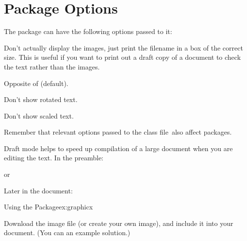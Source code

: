 \section{Package Options}

The  package can have the following options passed to 
it:
\begin{fwlist}{}
 Don't actually display the
images, just print the filename in a box of the correct size.  This
is useful if you want to print out a draft copy of a document to
check the text rather than the images.

 Opposite of 
 (default).

 Don't show rotated
text.

 Don't show scaled text.

\end{fwlist}

Remember that relevant options passed to the class file\indexCLS\ also 
affect packages.


Draft mode helps to speed up compilation of a large document when
you are editing the text. In the preamble:
\begin{codeS}
\end{codeS}
or
\begin{code}
\begin{alltt}

\end{alltt}
\end{code}
Later in the document:
\begin{codeS}
\end{codeS}
\begin{resultS}
\end{resultS}

\begin{exercise}{Using the  Package}{ex:graphicx}

Download the image file
%
 (or create your own image),
and include it into your document. (You
can  an example solution.)
\end{exercise}


